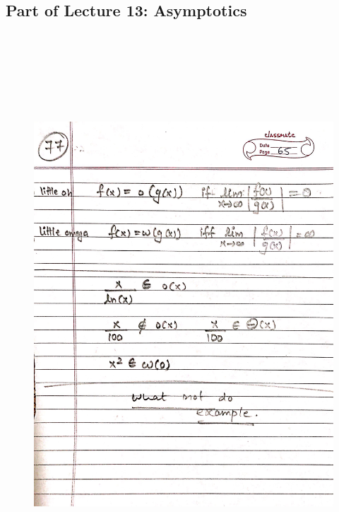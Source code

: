 \newpage
{\color{black} \subsection*{Part of Lecture 13: Asymptotics}}
\begin{figure}[H]
    \centering
    \includegraphics[width=16cm, height=21cm]{"./MIT-6.042J/MIT-6042J-077"}
\end{figure}
